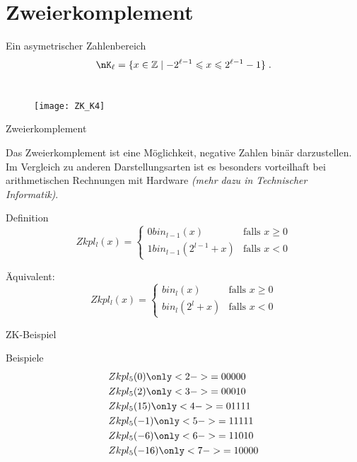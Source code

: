 \section{Zweierkomplement}

\begin{frame}{Ein asymetrischer Zahlenbereich}
	\[
	\nK_{\ell} = \{ x\in \Z\mid -2^{\ell-1} \leq x \leq 2^{\ell-1} -1 \} \;.
	\]
	\\[0.2cm]
	
	\begin{figure}
		\centering
		\texttt{[image: ZK\_K4]}
	\end{figure}
	
\end{frame}

\begin{frame}{Zweierkomplement}

	Das Zweierkomplement ist eine Möglichkeit, negative Zahlen binär darzustellen. Im Vergleich zu anderen Darstellungsarten ist es besonders vorteilhaft bei arithmetischen Rechnungen mit Hardware \textit{(mehr dazu in Technischer Informatik)}.

	\begin{block}{Definition}
		$$Zkpl_l(x) = \begin{cases} 0 bin_{l-1}(x) & \text{falls } x \geq 0 \\ 1 bin_{l-1}(2^{l-1}+x) & \text{falls } x < 0\end{cases}$$
		
		Äquivalent:
		$$Zkpl_l(x) = \begin{cases} bin_{l}(x) & \text{falls } x \geq 0 \\ bin_{l}(2^{l}+x) & \text{falls } x < 0\end{cases}$$
	\end{block}
\end{frame}

\begin{frame}{ZK-Beispiel}
	\begin{block}{Beispiele}
		\begin{align*}
			&Zkpl_5(0) \only<2->{= 00000} \\
			&Zkpl_5(2) \only<3->{= 00010} \\
			&Zkpl_5(15) \only<4->{= 01111} \\
			&Zkpl_5(-1) \only<5->{= 11111} \\
			&Zkpl_5(-6) \only<6->{= 11010} \\
			&Zkpl_5(-16) \only<7->{= 10000}
		\end{align*}
	\end{block}
\end{frame}

